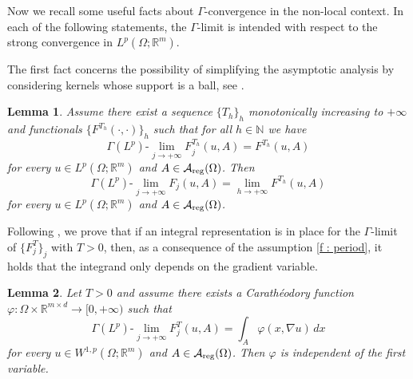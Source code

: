 \documentclass{article}
\newtheorem{lemma}{Lemma}[section]
\theoremstyle{definition}
\newcommand{\f}{\varphi}
\newcommand{\N}{\mathbb{N}}
\newcommand{\R}{\mathbb{R}}
\newcommand{\A}{\mathcal{A}}
\begin{document}
Now we recall some useful facts about $\Gamma$-convergence in the non-local context. In each of the following statements, the $\Gamma$-limit is intended with respect to the strong convergence in $L^p(\Omega;\R^m)$. 

The first fact concerns the possibility of simplifying the asymptotic analysis by considering kernels whose support is a ball, see \cite[Lemma 5.1]{AABPT}.

\begin{lemma}\label{lemma : truncated functionals} Assume there exist a sequence $\{T_h\}_h$ monotonically increasing to $+\infty$ and functionals $\{F^{T_h}(\cdot,\cdot)\}_h$ such that for all $h\in\N$ we have
\begin{equation*}
    \Gamma(L^p)\text{-}\lim_{j\to+\infty} F^{T_h}_j(u,A) = F^{T_h}(u,A) 
\end{equation*}
for every $u\in L^p(\Omega; \R^m)$ and $A\in \A_{\rm reg}(\Omega)$. Then
\begin{equation*}
   \Gamma(L^p)\text{-}\lim_{j\to+\infty} F_j(u,A) =\lim_{h\to+\infty} F^{T_h}(u,A) 
\end{equation*}
for every $u\in L^p(\Omega; \R^m)$ and $A\in \A_{\rm reg}(\Omega)$.
\end{lemma}

Following \cite[Proposition 6.1]{AABPT}, we prove that if an integral representation is in place for the $\Gamma$-limit of $\{F^T_j\}_j$ with $T>0$, then, as a consequence of the assumption \eqref{f : period}, it holds that the integrand only depends on the gradient variable.

\begin{lemma}\label{lemma : homogeneity} Let $T>0$ and assume there exists a Carathéodory function $\varphi:\Omega\times \R^{m\times d}\to[0,+\infty)$ such that 
\begin{equation*}
     \Gamma(L^p)\text{-}\lim_{j\to+\infty} F^T_j(u,A) = \int_A \f(x, \nabla u)\, dx
\end{equation*}
for every $u\in W^{1,p}(\Omega; \R^m)$ and $A\in\A_{\rm reg}(\Omega)$. Then $\f$ is independent of the first variable.
\end{lemma}
\end{document}
